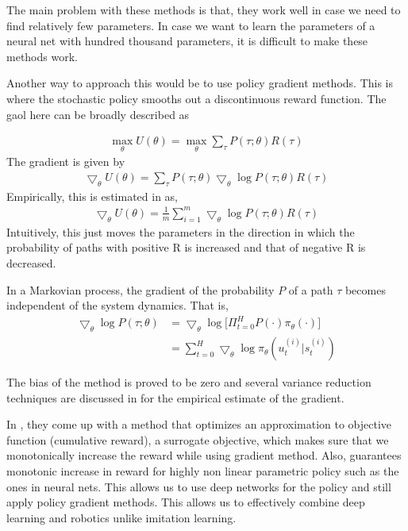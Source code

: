 \documentclass[11pt]{article}
\begin{document}
The main problem with these methods is that, they work well in case we need to find relatively few parameters. In case we want to learn the parameters of a neural net with hundred thousand parameters, it is difficult to make these methods work. 

Another way to approach this would be to use policy gradient methods. This is where the stochastic policy smooths out a discontinuous reward function. The gaol here can be broadly described as 

\begin{align}
\max_{\theta}U(\theta) = \max_{\theta }\sum_{\tau{}}P(\tau{} ;\theta)R(\tau{})
\end{align}
The gradient is given by 
\begin{align}
\bigtriangledown_\theta U(\theta) = \sum_\tau P(\tau;\theta) \bigtriangledown_\theta \log{P(\tau;\theta)} R(\tau)
\end{align}
Empirically, this is estimated in \cite{gpomdp} as,
\begin{align}
\bigtriangledown_\theta U(\theta) = \frac{1}{m}\sum_{i=1}^m \bigtriangledown_\theta \log{P(\tau;\theta)} R(\tau)
\end{align}
Intuitively, this just moves the parameters in the direction in which the probability of paths with positive R is increased and that of negative R is decreased.  

In a Markovian process, the gradient of the probability $P$ of a path $\tau$ becomes independent of the system dynamics. That is,
\begin{align*}
 \bigtriangledown_\theta \log{P(\tau;\theta)} &=  \bigtriangledown_\theta \log \Big[ \Pi_{t=0}^H P(\cdot)  \pi_{\theta}(\cdot) \Big]\\
 &= \sum_{t=0}^H \bigtriangledown_\theta \log{\pi_\theta(u_t^{(i)}|s_t^{(i)})}
\end{align*}

The bias of the method is proved to be zero and several variance reduction techniques are discussed in \cite{var} for the empirical estimate of the gradient.

In \cite{approx}, they come up with a method that optimizes an approximation to objective function (cumulative reward), a surrogate objective, which makes sure that we monotonically increase the reward while using gradient method. Also, \cite{trpo} guarantees monotonic increase in reward for highly non linear parametric policy such as the ones in neural nets. This allows us to use deep networks for the policy and still apply policy gradient methods. This allows us to effectively combine deep learning and robotics unlike imitation learning.
\end{document}
